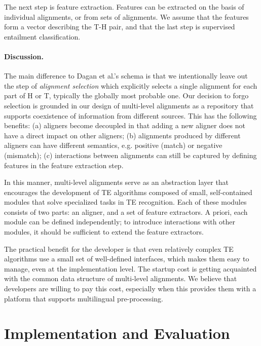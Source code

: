 \documentclass[11pt,letterpaper]{article}
\begin{document}
The next step is feature extraction. Features can be extracted on the
basis of individual alignments, or from sets of alignments. We assume
that the features form a vector describing the T-H pair, and that the
last step is supervised entailment classification.

\paragraph{Discussion.} The main difference to Dagan et al.'s schema
is that we intentionally leave out the step of {\em alignment
  selection} which explicitly selects a single alignment for each part
of H or T, typically the globally most probable one.  Our decision to
forgo selection is grounded in our design of multi-level alignments as
a repository that supports coexistence of information from different
sources. This has the following benefits: (a) aligners become
decoupled in that adding a new aligner does not have a direct impact
on other aligners;
(b) alignments produced by different aligners
can have different semantics, e.g. positive (match) or negative
(mismatch); (c) interactions between alignments can still be captured
by defining features in the feature extraction step.

In this manner, multi-level alignments serve as an abstraction layer
that encourages the development of TE algorithms composed of small,
self-contained modules that solve specialized tasks in TE
recognition. Each of these modules consists of two parts: an aligner,
and a set of feature extractors. A priori, each module can be defined
independently; to introduce interactions with other modules, it should
be sufficient to extend the feature extractors.

The practical benefit for the developer is that even relatively
complex TE algorithms use a small set of well-defined interfaces,
which makes them easy to manage, even at the implementation level. The
startup cost is getting acquainted with the common data structure of
multi-level alignments. We believe that developers are willing to pay
this cost, especially when this provides them with a platform that
supports multilingual pre-processing.

\section{Implementation and Evaluation}
\label{sec:impl}
\end{document}
